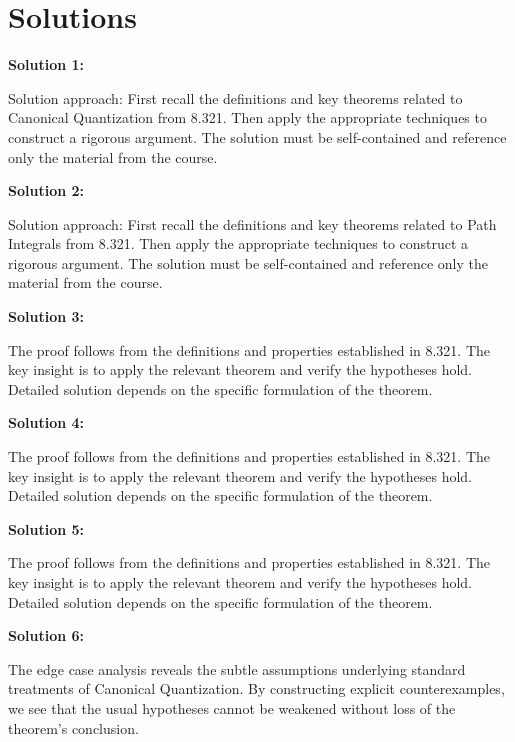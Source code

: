 \documentclass[12pt,a4paper]{exam}
\begin{document}
\newpage
\section*{Solutions}

\textbf{Solution 1:}

Solution approach: First recall the definitions and key theorems related to Canonical Quantization from 8.321. Then apply the appropriate techniques to construct a rigorous argument. The solution must be self-contained and reference only the material from the course.

\vspace{0.5cm}

\textbf{Solution 2:}

Solution approach: First recall the definitions and key theorems related to Path Integrals from 8.321. Then apply the appropriate techniques to construct a rigorous argument. The solution must be self-contained and reference only the material from the course.

\vspace{0.5cm}

\textbf{Solution 3:}

The proof follows from the definitions and properties established in 8.321. The key insight is to apply the relevant theorem and verify the hypotheses hold. Detailed solution depends on the specific formulation of the theorem.

\vspace{0.5cm}

\textbf{Solution 4:}

The proof follows from the definitions and properties established in 8.321. The key insight is to apply the relevant theorem and verify the hypotheses hold. Detailed solution depends on the specific formulation of the theorem.

\vspace{0.5cm}

\textbf{Solution 5:}

The proof follows from the definitions and properties established in 8.321. The key insight is to apply the relevant theorem and verify the hypotheses hold. Detailed solution depends on the specific formulation of the theorem.

\vspace{0.5cm}

\textbf{Solution 6:}

The edge case analysis reveals the subtle assumptions underlying standard treatments of Canonical Quantization. By constructing explicit counterexamples, we see that the usual hypotheses cannot be weakened without loss of the theorem's conclusion.
\end{document}
